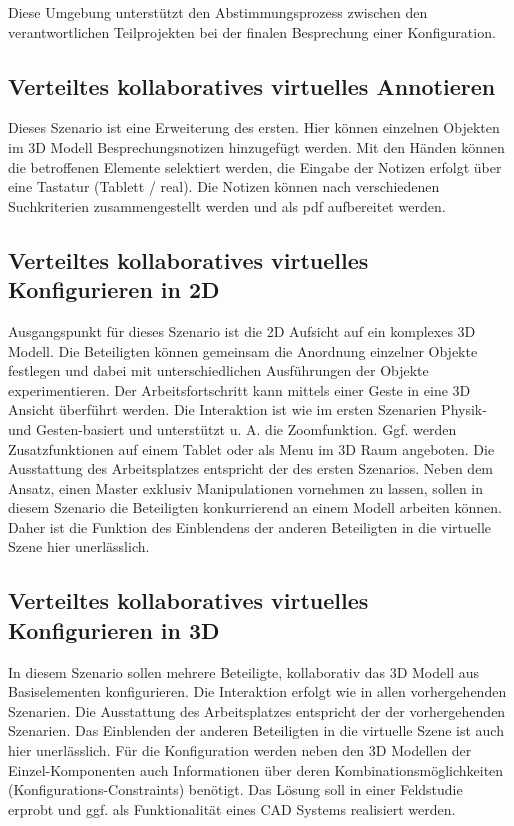 Diese Umgebung unterstützt den Abstimmungsprozess zwischen den verantwortlichen Teilprojekten bei der finalen Besprechung einer Konfiguration.


\subsection{Verteiltes kollaboratives virtuelles Annotieren}

Dieses Szenario ist eine Erweiterung des ersten. Hier können einzelnen Objekten im 3D Modell Besprechungsnotizen hinzugefügt werden. Mit den Händen können die betroffenen Elemente selektiert werden, die Eingabe der Notizen erfolgt über eine Tastatur (Tablett / real). Die Notizen können nach verschiedenen Suchkriterien zusammengestellt werden und als pdf aufbereitet werden.

\subsection{Verteiltes kollaboratives virtuelles Konfigurieren in 2D}
Ausgangspunkt für dieses Szenario ist die 2D Aufsicht auf ein komplexes 3D Modell. Die Beteiligten können gemeinsam die Anordnung einzelner Objekte festlegen und dabei mit unterschiedlichen Ausführungen der Objekte experimentieren. Der Arbeitsfortschritt kann mittels einer Geste in eine 3D Ansicht überführt werden.
Die Interaktion ist wie im ersten Szenarien Physik- und Gesten-basiert und unterstützt u. A. die Zoomfunktion. Ggf. werden Zusatzfunktionen auf einem Tablet oder als Menu im 3D Raum angeboten. Die Ausstattung des Arbeitsplatzes entspricht der des ersten Szenarios. Neben dem Ansatz, einen Master exklusiv Manipulationen vornehmen zu lassen, sollen in diesem Szenario die Beteiligten konkurrierend an einem Modell arbeiten können. Daher ist die Funktion des Einblendens der anderen Beteiligten in die virtuelle Szene hier unerlässlich.

\subsection{Verteiltes kollaboratives virtuelles Konfigurieren in 3D}
In diesem Szenario sollen mehrere Beteiligte, kollaborativ das 3D Modell aus Basiselementen konfigurieren. Die Interaktion erfolgt wie in allen vorhergehenden Szenarien. Die Ausstattung des Arbeitsplatzes entspricht der der vorhergehenden Szenarien. Das Einblenden der anderen Beteiligten in die virtuelle Szene ist auch hier unerlässlich. Für die Konfiguration werden neben den 3D Modellen der Einzel-Komponenten auch Informationen über deren Kombinationsmöglichkeiten (Konfigurations-Constraints) benötigt. Das Lösung soll in einer Feldstudie erprobt und ggf. als Funktionalität eines CAD Systems realisiert werden.

